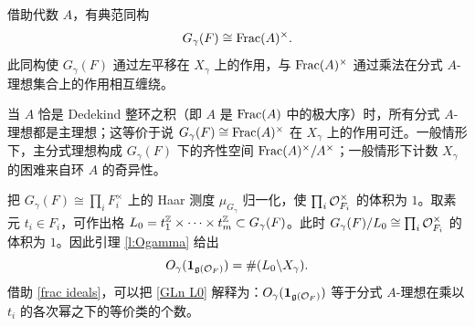 借助代数 $A$，有典范同构
\begin{equation*}
G_{\gamma}(F)\cong \textup{Frac}(A)^{\times}.
\end{equation*}
此同构使 $G_{\gamma}(F)$ 通过左平移在 $X_{\gamma}$ 上的作用，与 $\textup{Frac}(A)^{\times}$ 通过乘法在分式 $A$-理想集合上的作用相互缠绕。

当 $A$ 恰是 Dedekind 整环之积（即 $A$ 是 $\textup{Frac}(A)$ 中的极大序）时，所有分式 $A$-理想都是主理想；这等价于说 $G_{\gamma}(F)\cong \textup{Frac}(A)^{\times}$ 在 $X_{\gamma}$ 上的作用可迁。一般情形下，主分式理想构成 $G_{\gamma}(F)$ 下的齐性空间 $\textup{Frac}(A)^{\times}/A^{\times}$；一般情形下计数 $X_{\gamma}$ 的困难来自环 $A$ 的奇异性。

把 $G_{\gamma}(F)\cong\prod_{i}F^{\times}_{i}$ 上的 Haar 测度 $\mu_{G_{\gamma}}$ 归一化，使 $\prod_{i}\mathcal{O}^{\times}_{F_{i}}$ 的体积为 $1$。取素元 $t_{i}\in F_{i}$，可作出格 $L_{0}=t^{\mathbb{Z}}_{1}\times \cdots\times t^{\mathbb{Z}}_{m}\subset G_{\gamma}(F)$。此时 $G_{\gamma}(F)/L_{0}\cong \prod_{i}\mathcal{O}_{F_{i}}^{\times}$ 的体积为 $1$。因此引理 \ref{l:Ogamma} 给出
\begin{equation}\label{GLn L0}
O_{\gamma}(\mathbf{1}_{\mathfrak{g}(\mathcal{O}_{F})})=\#(L_{0}\backslash X_{\gamma}).
\end{equation}
借助 \eqref{frac ideals}，可以把 \eqref{GLn L0} 解释为：$O_{\gamma}(\mathbf{1}_{\mathfrak{g}(\mathcal{O}_{F})})$ 等于分式 $A$-理想在乘以 $t_{i}$ 的各次幂之下的等价类的个数。

